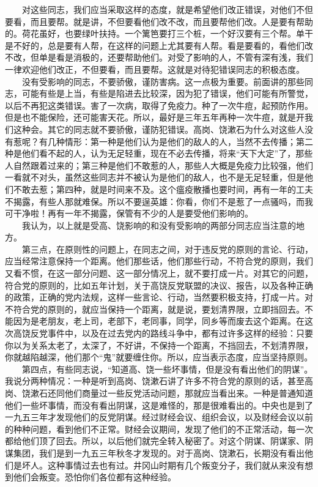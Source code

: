 \documentclass[cn,11pt,chinese]{elegantbook}
\begin{document}
　　对这些同志，我们应当采取这样的态度，就是希望他们改正错误，对他们不但要看，而且要帮。就是讲，不但要看他们改不改，而且要帮他们改。人是要有帮助的。荷花虽好，也要绿叶扶持。一个篱笆要打三个桩，一个好汉要有三个帮。单干是不好的，总是要有人帮，在这样的问题上尤其要有人帮。看是要看的，看他们改不改，但单是看是消极的，还要帮助他们。对受了影响的人，不管有深有浅，我们一律欢迎他们改正，不但要看，而且要帮。这就是对待犯错误同志的积极态度。\\
　　没有受影响的同志，不要骄傲，谨防害病。这一点极为重要。前面讲的那些同志，可能有些是上当，有些是陷进去比较深，因为犯了错误，他们可能有所警觉，以后不再犯这类错误。害了一次病，取得了免疫力。种了一次牛痘，起预防作用。但是也不能保险，还可能害天花。所以，最好是三年五年再种一次牛痘，就是开我们这种会。其它的同志就不要骄傲，谨防犯错误。高岗、饶漱石为什么对这些人没有惹呢？有几种情形：第一种是他们认为是他们的敌人的人，当然不去传播；第二种是他们看不起的人，认为无足轻重，现在不必去传播，将来“天下大定”了，那些人自然跟着过来的；第三种是他们不敢惹的人，那些人大概是免疫力比较强，他们一看就不对头，虽然这些同志并不被认为是他们的敌人，也不是无足轻重，但是他们不敢去惹；第四种，就是时间来不及。这个瘟疫散播也要时间，再有一年的工夫不揭露，有些人那就难保。所以不要逞英雄：你看，你们不是惹了一点骚吗，而我可干净啦！再有一年不揭露，保管有不少的人是要受他们影响的。\\
　　我认为，以上就是受高、饶影响的和没有受影响的两部分同志应当注意的地方。\\
　　第三点，在原则性的问题上，在同志之间，对于违反党的原则的言论、行动，应当经常注意保持一个距离。他们那些话，他们那些行动，不符合党的原则，我们又看不惯，在这一部分问题、这一部分情况上，就不要打成一片。对其它的问题，符合党的原则的，比如五年计划，关于高饶反党联盟的决议、报告，以及各种正确的政策，正确的党内法规，这样一些言论、行动，当然要积极支持，打成一片。对不符合党的原则的，就应当保持一个距离，就是说，要划清界限，立即挡回去。不能因为是老朋友，老上司，老部下，老同事，同学，同乡等而废去这个距离。在这次高饶反党事件中，以及在过去党内的路线斗争中，都有过许多这样的经验：只要你以为关系太老了，太深了，不好讲，不保持一个距离，不挡回去，不划清界限，你就越陷越深，他们那个“鬼”就要缠住你。所以，应当表示态度，应当坚持原则。\\
　　第四点，有些同志说，“知道高、饶一些坏事情，但是没有看出他们的阴谋”。我说分两种情况：一种是听到高岗、饶漱石讲了许多不符合党的原则的话，甚至高岗、饶漱石还同他们商量过一些反党活动问题，那就应当看出来。一种是普通知道他们一些坏事情，而没有看出阴谋，这是难怪的，那是很难看出的。中央也是到了一九五三年才发现他们的反党阴谋。经过财经会议、组织会议，以及财经会议以前的种种问题，看到他们不正常。财经会议期间，发现了他们的不正常活动，每一次都给他们顶了回去。所以，以后他们就完全转入秘密了。对这个阴谋、阴谋家、阴谋集团，我们是到一九五三年秋冬才发现的。对于高岗、饶漱石，长期没有看出他们是坏人。这种事情过去也有过。井冈山时期有几个叛变分子，我们就从来没有想到他们会叛变。恐怕你们各位都有这种经验。\\
\end{document}
